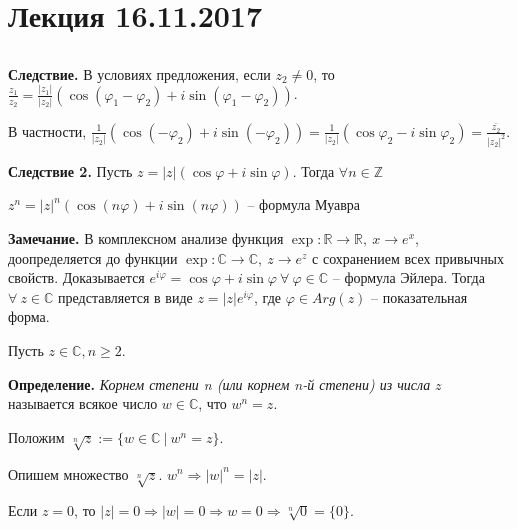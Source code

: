 \section{Лекция 16.11.2017}

\subsection{}

\textbf{Следствие.} В условиях предложения, если $z_2 \neq 0$, то $\frac{z_1}{z_2} = \frac{|z_1|}{|z_2|} (\cos (\varphi_1 - \varphi_2) + i \sin(\varphi_1 - \varphi_2))$.

\vspace{\baselineskip}
В частности, $\frac{1}{|z_2|}(\cos(- \varphi_2) + i\sin(- \varphi_2)) = \frac{1}{|z_2|}(\cos \varphi_2 - i \sin \varphi_2) = \frac{\overline{z_2}}{|z_2|^2}$.

\vspace{\baselineskip}
\textbf{Следствие 2.} Пусть $z = |z|(\cos \varphi + i \sin \varphi)$. Тогда $\forall n \in \mathbb{Z}$

\vspace{\baselineskip}
$z^n = |z|^n (\cos(n \varphi) + i \sin(n \varphi))$ -- формула Муавра

\vspace{\baselineskip}
\textbf{Замечание.} В комплексном анализе функция $\exp: \mathbb{R} \rightarrow \mathbb{R}, \ x \rightarrow e^x$, доопределяется до функции $\exp: \mathbb{C} \rightarrow \mathbb{C}, \ z \rightarrow e^z$ с сохранением всех привычных свойств. Доказывается $e^{i \varphi} = \cos \varphi + i \sin \varphi \ \forall \ \varphi \in \mathbb{C}$ -- формула Эйлера. Тогда $\forall \ z \in \mathbb{C}$ представляется в виде $z = |z| e^{i \varphi}$, где $\varphi \in Arg(z)$ -- показательная форма.

\vspace{\baselineskip}
Пусть $z \in \mathbb{C}, n \geq 2$.

\textbf{Определение.} \textit{Корнем степени n (или корнем n-й степени) из числа} $z$ называется всякое число $w \in \mathbb{C}$, что $w^n = z$.

Положим $\sqrt[n]{z} := \{w \in \mathbb{C} \ | \ w^n = z \}$.

\vspace{\baselineskip}
Опишем множество $\sqrt[n]{z}$.
$w^n \Rightarrow |w|^n = |z|$.

Если $z = 0$, то $|z| = 0 \Rightarrow |w| = 0 \Rightarrow w = 0 \Rightarrow \sqrt[n]{0} = \{ 0 \}$. 

